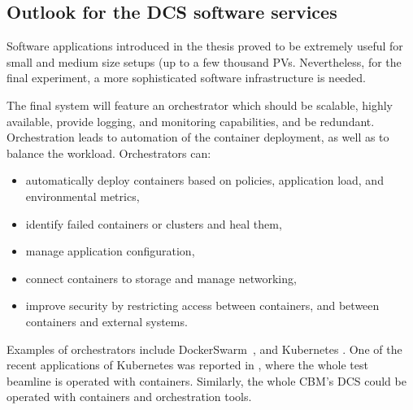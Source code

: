 \subsection{Outlook for the DCS software services} 
Software applications introduced in the thesis proved to be extremely useful for small and medium size setups (up to a few thousand \glspl{PV}. Nevertheless, for the final experiment, a more sophisticated software infrastructure is needed.

The final system will feature an orchestrator which should be scalable, highly available, provide logging, and monitoring capabilities, and be redundant. Orchestration leads to automation of the container deployment, as well as to balance the workload. Orchestrators can:
 \begin{itemize}
     \item automatically deploy containers based on policies, application load, and environmental metrics,
     \item identify failed containers or clusters and heal them,
     \item manage application configuration,
     \item connect containers to storage and manage networking,
     \item improve security by restricting access between containers, and between containers and external systems.
 \end{itemize}

 Examples of orchestrators include DockerSwarm~\cite{DockerSwarm}, and Kubernetes \cite{Kubernetes}. One of the recent applications of Kubernetes was reported in \cite{ICALEPCS2021:Diamond}, where the whole test beamline is operated with containers. Similarly, the whole \gls{CBM}'s \gls{DCS} could be operated with containers and orchestration tools. 

